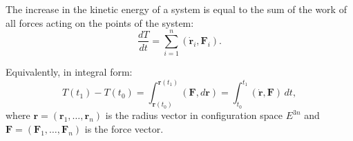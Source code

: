 The increase in the kinetic energy of a system is equal to the sum of the work of all forces acting on the points of the system:
$$\frac{dT}{dt} = \sum_{i=1}^{n} (\dot{\mathbf{r}}_i, \mathbf{F}_i).$$

Equivalently, in integral form:
$$T(t_1) - T(t_0) = \int_{\mathbf{r}(t_0)}^{\mathbf{r}(t_1)} (\mathbf{F}, d\mathbf{r}) = \int_{t_0}^{t_1} (\dot{\mathbf{r}}, \mathbf{F}) \, dt,$$
where $\mathbf{r} = (\mathbf{r}_1, \ldots, \mathbf{r}_n)$ is the radius vector in configuration space $E^{3n}$ and $\mathbf{F} = (\mathbf{F}_1, \ldots, \mathbf{F}_n)$ is the force vector.
